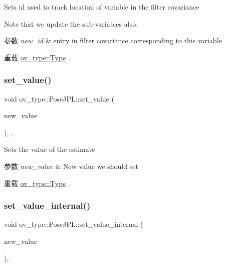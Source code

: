Sets id used to track location of variable in the filter covariance 

Note that we update the sub-\/variables also.


\begin{DoxyParams}{参数}
{\em new\+\_\+id} & entry in filter covariance corresponding to this variable \\
\hline
\end{DoxyParams}


重载 \hyperlink{classov__type_1_1Type_a52cb2fe6e25dbe8875da3fd618cf0b61}{ov\+\_\+type\+::\+Type} .

\mbox{\label{classov__type_1_1PoseJPL_a203f719544e8f3e11eb74b1b1458e3d6}} 
\subsubsection{\texorpdfstring{set\+\_\+value()}{set\_value()}}
{\footnotesize\ttfamily void ov\+\_\+type\+::\+Pose\+J\+P\+L\+::set\+\_\+value (\begin{DoxyParamCaption}\item[{const Eigen\+::\+Matrix\+Xd \&}]{new\+\_\+value }\end{DoxyParamCaption})\hspace{0.3cm}{\ttfamily [inline]}, {\ttfamily [override]}, {\ttfamily [virtual]}}



Sets the value of the estimate 


\begin{DoxyParams}{参数}
{\em new\+\_\+value} & New value we should set \\
\hline
\end{DoxyParams}


重载 \hyperlink{classov__type_1_1Type_a81c73f0b6c10f2550a487019a59796a9}{ov\+\_\+type\+::\+Type} .

\mbox{\label{classov__type_1_1PoseJPL_ab1a626a94a9c7013a253dd16a2b6a0cc}} 
\subsubsection{\texorpdfstring{set\+\_\+value\+\_\+internal()}{set\_value\_internal()}}
{\footnotesize\ttfamily void ov\+\_\+type\+::\+Pose\+J\+P\+L\+::set\+\_\+value\+\_\+internal (\begin{DoxyParamCaption}\item[{const Eigen\+::\+Matrix\+Xd \&}]{new\+\_\+value }\end{DoxyParamCaption})\hspace{0.3cm}{\ttfamily [inline]}, {\ttfamily [protected]}}



